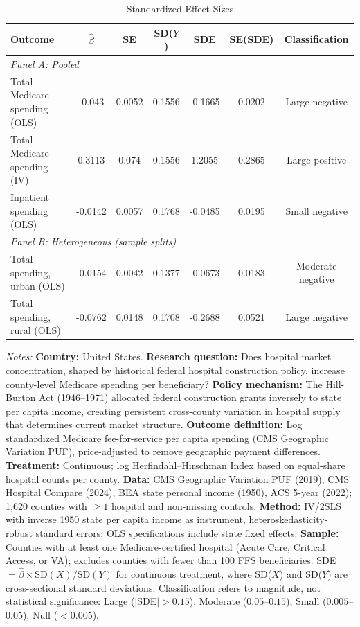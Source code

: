 \begin{table}[t]
\centering
\begin{threeparttable}
\caption{Standardized Effect Sizes}
\label{tab:sde}
\footnotesize
\begin{tabular}{lcccccc}
\toprule
Outcome & $\hat{\beta}$ & SE & SD($Y$) & SDE & SE(SDE) & Classification \\
\midrule
\multicolumn{7}{l}{\textit{Panel A: Pooled}} \\
Total Medicare spending (OLS) & -0.043 & 0.0052 & 0.1556 & -0.1665 & 0.0202 & Large negative \\
Total Medicare spending (IV) & 0.3113 & 0.074 & 0.1556 & 1.2055 & 0.2865 & Large positive \\
Inpatient spending (OLS) & -0.0142 & 0.0057 & 0.1768 & -0.0485 & 0.0195 & Small negative \\
\midrule
\multicolumn{7}{l}{\textit{Panel B: Heterogeneous (sample splits)}} \\
Total spending, urban (OLS) & -0.0154 & 0.0042 & 0.1377 & -0.0673 & 0.0183 & Moderate negative \\
Total spending, rural (OLS) & -0.0762 & 0.0148 & 0.1708 & -0.2688 & 0.0521 & Large negative \\
\bottomrule
\end{tabular}
\begin{tablenotes}[flushleft]
\item \textit{Notes:} \textbf{Country:} United States. \textbf{Research question:} Does hospital market concentration, shaped by historical federal hospital construction policy, increase county-level Medicare spending per beneficiary? \textbf{Policy mechanism:} The Hill-Burton Act (1946--1971) allocated federal construction grants inversely to state per capita income, creating persistent cross-county variation in hospital supply that determines current market structure. \textbf{Outcome definition:} Log standardized Medicare fee-for-service per capita spending (CMS Geographic Variation PUF), price-adjusted to remove geographic payment differences. \textbf{Treatment:} Continuous; log Herfindahl--Hirschman Index based on equal-share hospital counts per county. \textbf{Data:} CMS Geographic Variation PUF (2019), CMS Hospital Compare (2024), BEA state personal income (1950), ACS 5-year (2022); 1,620 counties with $\geq 1$ hospital and non-missing controls. \textbf{Method:} IV/2SLS with inverse 1950 state per capita income as instrument, heteroskedasticity-robust standard errors; OLS specifications include state fixed effects. \textbf{Sample:} Counties with at least one Medicare-certified hospital (Acute Care, Critical Access, or VA); excludes counties with fewer than 100 FFS beneficiaries. SDE $= \hat{\beta} \times \text{SD}(X) / \text{SD}(Y)$ for continuous treatment, where SD($X$) and SD($Y$) are cross-sectional standard deviations. Classification refers to magnitude, not statistical significance: Large ($|$SDE$| > 0.15$), Moderate ($0.05$--$0.15$), Small ($0.005$--$0.05$), Null ($< 0.005$).
\end{tablenotes}
\end{threeparttable}
\end{table}
